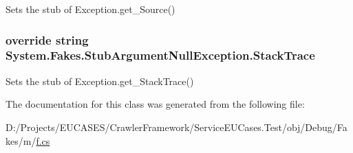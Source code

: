 Sets the stub of Exception.\-get\-\_\-\-Source()

\hypertarget{class_system_1_1_fakes_1_1_stub_argument_null_exception_a79993cd3cba37e4dd5246e6337bf2e40}{
\subsubsection[{Stack\-Trace}]{\setlength{\rightskip}{0pt plus 5cm}override string System.\-Fakes.\-Stub\-Argument\-Null\-Exception.\-Stack\-Trace\hspace{0.3cm}{\ttfamily [get]}}}\label{class_system_1_1_fakes_1_1_stub_argument_null_exception_a79993cd3cba37e4dd5246e6337bf2e40}


Sets the stub of Exception.\-get\-\_\-\-Stack\-Trace()



The documentation for this class was generated from the following file\-:\begin{DoxyCompactItemize}
\item 
D\-:/\-Projects/\-E\-U\-C\-A\-S\-E\-S/\-Crawler\-Framework/\-Service\-E\-U\-Cases.\-Test/obj/\-Debug/\-Fakes/m/\hyperlink{m_2f_8cs}{f.\-cs}\end{DoxyCompactItemize}
